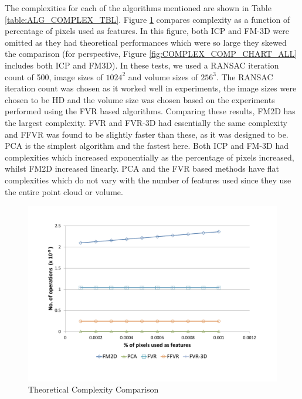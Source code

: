 The complexities for each of the algorithms mentioned are shown in Table \ref{table:ALG_COMPLEX_TBL}. Figure \ref{fig:COMPLEX_COMP_CHART} compares complexity as a function of percentage of pixels used as features. In this figure, both ICP and FM-3D were omitted as they had theoretical performances which were so large they skewed the comparison (for perspective, Figure \ref{fig:COMPLEX_COMP_CHART_ALL} includes both ICP and FM3D). In these tests, we used a RANSAC iteration count of 500, image sizes of $1024^2$ and volume sizes of $256^3$. The RANSAC iteration count was chosen as it worked well in experiments, the image sizes were chosen to be HD and the volume size was chosen based on the experiments performed using the FVR based algorithms. Comparing these results, FM2D has the largest complexity. FVR and FVR-3D had essentially the same complexity and FFVR was found to be slightly faster than these, as it was designed to be. PCA is the simplest algorithm and the fastest here. Both ICP and FM-3D had complexities which increased exponentially as the percentage of pixels increased, whilst FM2D increased linearly. PCA and the FVR based methods have flat complexities which do not vary with the number of features used since they use the entire point cloud or volume. \\


\begin{figure}
        \centering
        \includegraphics[width=5.0in]{images/theoreticalSpeedComparison}
        \caption{Theoretical Complexity Comparison}
        \label{fig:COMPLEX_COMP_CHART}
\end{figure}


